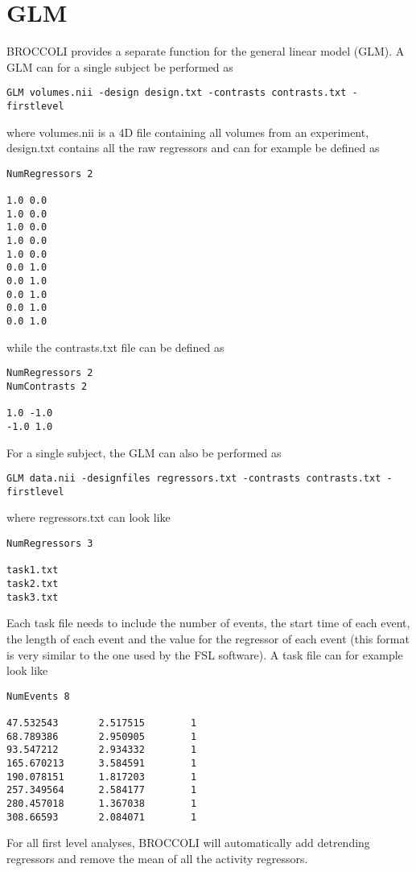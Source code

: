 \section{GLM}

BROCCOLI provides a separate function for the general linear model (GLM). A GLM can for a single subject be performed as

\begin{verbatim}
GLM volumes.nii -design design.txt -contrasts contrasts.txt -firstlevel
\end{verbatim}
where volumes.nii is a 4D file containing all volumes from an experiment, design.txt contains all the raw regressors and can for example be defined as

\begin{verbatim}
NumRegressors 2

1.0 0.0
1.0 0.0
1.0 0.0
1.0 0.0
1.0 0.0
0.0 1.0
0.0 1.0
0.0 1.0
0.0 1.0
0.0 1.0
\end{verbatim}
while the contrasts.txt file can be defined as

\begin{verbatim}
NumRegressors 2
NumContrasts 2

1.0 -1.0
-1.0 1.0
\end{verbatim}
\newpage
\noindent For a single subject, the GLM can also be performed as 

\begin{verbatim}
GLM data.nii -designfiles regressors.txt -contrasts contrasts.txt -firstlevel
\end{verbatim}
where regressors.txt can look like

\begin{verbatim}
NumRegressors 3

task1.txt
task2.txt
task3.txt
\end{verbatim}
Each task file needs to include the number of events, the start time of each event, the length of each event and the value for the regressor of each event (this format is very similar to the one used by the FSL software). A task file can for example look like

\begin{verbatim}
NumEvents 8

47.532543       2.517515        1
68.789386       2.950905        1
93.547212       2.934332        1
165.670213      3.584591        1
190.078151      1.817203        1
257.349564      2.584177        1
280.457018      1.367038        1
308.66593       2.084071        1
\end{verbatim}
For all first level analyses, BROCCOLI will automatically add detrending regressors and remove the mean of all the activity regressors. \newline 

